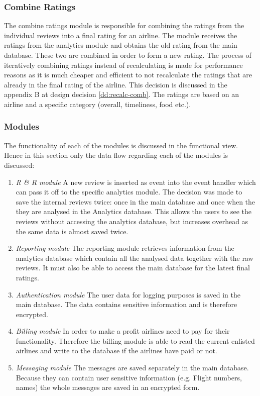 \subsubsection{Combine Ratings}
The combine ratings module is responsible for combining the ratings from the individual reviews into a final rating for an airline. The module receives the ratings from the analytics module and obtains the old rating from the main database. These two are combined in order to form a new rating. The process of iteratively combining ratings instead of recalculating is made for performance reasons as it is much cheaper and efficient to not recalculate the ratings that are already in the final rating of the airline. This decision is discussed in the appendix B at design decision \ref{dd:recalc-comb}. The ratings are based on an airline and a specific category (overall, timeliness, food etc.).

\subsubsection{Modules}
The functionality of each of the modules is discussed in the functional view. Hence in this section only the data flow regarding each of the modules is discussed:

\begin{enumerate}
\item \emph{R \& R module} A new review is inserted as event into the event handler which can pass it off to the specific analytics module. The decision was made to save the internal reviews twice: once in the main database and once when the they are analysed in the Analytics database. This allows the users to see the reviews without accessing the analytics database, but increases overhead as the same data is almost saved twice.
\item \emph{Reporting module} The reporting module retrieves information from the analytics database which contain all the analysed data together with the raw reviews. It must also be able to access the main database for the latest final ratings.
\item \emph{Authentication module} The user data for logging purposes is saved in the main database. The data contains sensitive information and is therefore encrypted.
\item \emph{Billing module} In order to make a profit airlines need to pay for their functionality. Therefore the billing module is able to read the current enlisted airlines and write to the database if the airlines have paid or not.
\item \emph{Messaging module} The messages are saved separately in the main database. Because they can contain user sensitive information (e.g. Flight numbers, names) the whole messages are saved in an encrypted form.
\end{enumerate}
